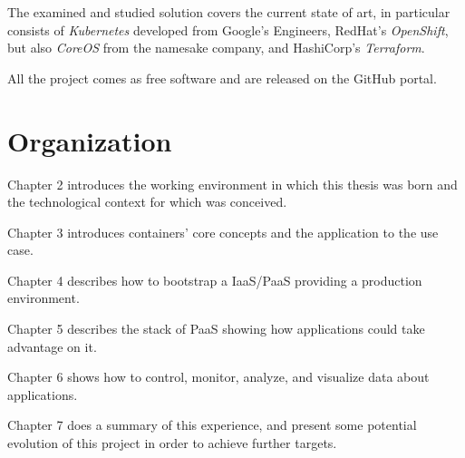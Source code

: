 The examined and studied solution covers the current state of art, in
particular consists of \emph{Kubernetes} developed from Google's
Engineers, RedHat's \emph{OpenShift}, but also \emph{CoreOS} from the
namesake company, and HashiCorp's \emph{Terraform}.

All the project comes as free software and are released on the GitHub
portal.

\section{Organization}\label{organization}

Chapter 2 introduces the working environment in which this thesis was
born and the technological context for which was conceived.

Chapter 3 introduces containers' core concepts and the application to
the use case.

Chapter 4 describes how to bootstrap a IaaS/PaaS providing a production
environment.

Chapter 5 describes the stack of PaaS showing how applications could
take advantage on it.

Chapter 6 shows how to control, monitor, analyze, and visualize data
about applications.

Chapter 7 does a summary of this experience, and present some potential
evolution of this project in order to achieve further targets.